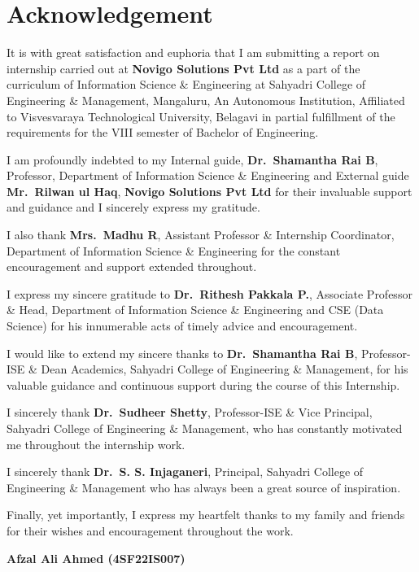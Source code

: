 \documentclass[12pt,a4paper,openany]{report}
\begin{document}
\newpage
{\setlength{\parskip}{4pt}
\chapter*{Acknowledgement}
It is with great satisfaction and euphoria that I am submitting a report on internship carried out at \textbf{Novigo Solutions Pvt Ltd} as a part of the curriculum of Information Science \& Engineering at Sahyadri College of Engineering \& Management, Mangaluru, An Autonomous Institution, Affiliated to Visvesvaraya Technological University, Belagavi in partial fulfillment of the requirements for the VIII semester of Bachelor of Engineering.
\par
\noindent I am profoundly indebted to my Internal guide, \textbf{Dr.~Shamantha Rai B}, Professor, Department of Information Science \& Engineering and External guide \textbf{Mr.~Rilwan ul Haq}, \textbf{Novigo Solutions Pvt Ltd} for their invaluable support and guidance and I sincerely express my gratitude.
\par
\noindent I also thank \textbf{Mrs.~Madhu R}, Assistant Professor \& Internship Coordinator, Department of Information Science \& Engineering for the constant encouragement and support extended throughout.
\par
\noindent I express my sincere gratitude to \textbf{Dr.~Rithesh Pakkala P.}, Associate Professor \& Head, Department of Information Science \& Engineering and CSE (Data Science) for his innumerable acts of timely advice and encouragement.
\par
\noindent I would like to extend my sincere thanks to \textbf{Dr.~Shamantha Rai B}, Professor-ISE \& Dean Academics, Sahyadri College of Engineering \& Management, for his valuable guidance and continuous support during the course of this Internship.
\par
\noindent I sincerely thank \textbf{Dr.~Sudheer Shetty}, Professor-ISE \& Vice Principal, Sahyadri College of Engineering \& Management, who has constantly motivated me throughout the internship work.
\par
\noindent I sincerely thank \textbf{Dr.~S. S. Injaganeri}, Principal, Sahyadri College of Engineering \& Management who has always been a great source of inspiration.
\par
\noindent Finally, yet importantly, I express my heartfelt thanks to my family and friends for their wishes and encouragement throughout the work.
\vspace{0.3in}
\begin{flushright}
\textbf{Afzal Ali Ahmed (4SF22IS007)}\\
\end{flushright}
}
\end{document}
